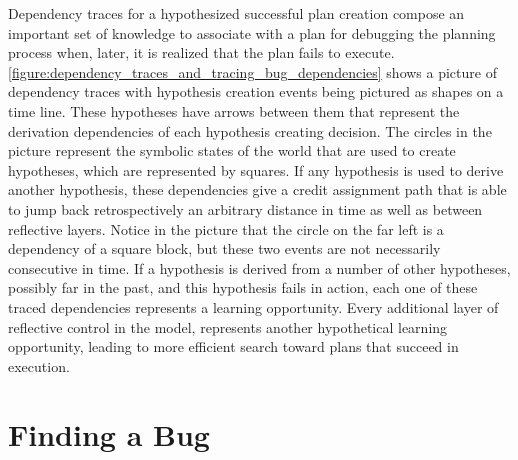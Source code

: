 Dependency traces for a hypothesized successful plan creation compose
an important set of knowledge to associate with a plan for debugging
the planning process when, later, it is realized that the plan fails
to execute.
{\mbox{\autoref{figure:dependency_traces_and_tracing_bug_dependencies}}}
shows a picture of dependency traces with hypothesis creation events
being pictured as shapes on a time line.  These hypotheses have arrows
between them that represent the derivation dependencies of each
hypothesis creating decision.  The circles in the picture represent
the symbolic states of the world that are used to create hypotheses,
which are represented by squares.  If any hypothesis is used to derive
another hypothesis, these dependencies give a credit assignment path
that is able to jump back retrospectively an arbitrary distance in
time as well as between reflective layers.  Notice in the picture that
the circle on the far left is a dependency of a square block, but
these two events are not necessarily consecutive in time.  If a
hypothesis is derived from a number of other hypotheses, possibly far
in the past, and this hypothesis fails in action, each one of these
traced dependencies represents a learning opportunity.  Every
additional layer of reflective control in the model, represents
another hypothetical learning opportunity, leading to more efficient
search toward plans that succeed in execution.

\section{Finding a Bug}

